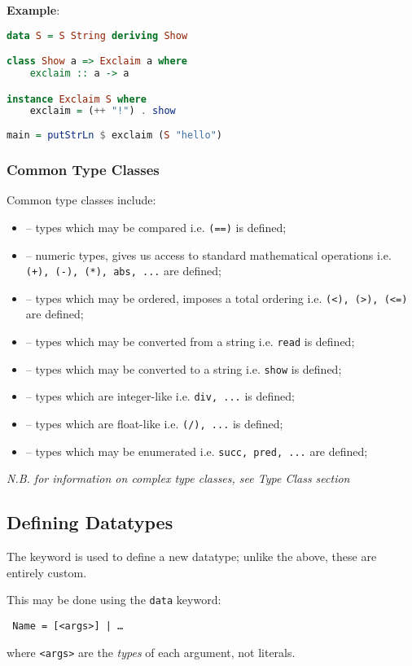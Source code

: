 \textbf{Example}:
\begin{lstlisting}[language=haskell]
data S = S String deriving Show

class Show a => Exclaim a where
    exclaim :: a -> a

instance Exclaim S where
    exclaim = (++ "!") . show
    
main = putStrLn $ exclaim (S "hello")
\end{lstlisting}

\subsubsection{Common Type Classes}
Common type classes include:
\begin{itemize}
  \item \texttt{} -- types which may be compared i.e. \texttt{(==)} is defined;
  \item \texttt{} -- numeric types, gives us access to standard mathematical operations i.e. \texttt{(+), (-), (*), abs, ...} are defined;
  \item \texttt{} -- types which may be ordered, imposes a total ordering i.e. \texttt{(<), (>), (<=)} are defined;
  \item \texttt{} -- types which may be converted from a string i.e. \texttt{read} is defined;
  \item \texttt{} -- types which may be converted to a string i.e. \texttt{show} is defined;
  \item \texttt{} -- types which are integer-like i.e. \texttt{div, ...} is defined;
  \item \texttt{} -- types which are float-like i.e. \texttt{(/), ...} is defined;
  \item \texttt{} -- types which may be enumerated i.e. \texttt{succ, pred, ...} are defined;
\end{itemize}

\textit{N.B. for information on complex type classes, see Type Class section}

\subsection{Defining Datatypes}
The  keyword is used to define a new datatype; unlike the above, these are entirely custom.

This may be done using the \texttt{data} keyword:
\begin{center}
  \texttt{ Name =  [<args>] | \ldots}
\end{center}
where \texttt{<args>} are the \textit{types} of each argument, not literals.

